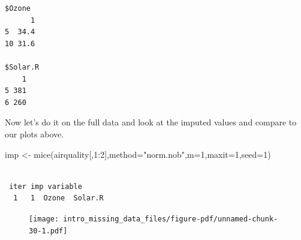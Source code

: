 \documentclass[
  letterpaper,
  DIV=11,
  numbers=noendperiod]{scrreprt}
\newenvironment{Shaded}{\begin{snugshade}}{\end{snugshade}}
\newcommand{\AttributeTok}[1]{\textcolor[rgb]{0.49,0.56,0.16}{#1}}
\newcommand{\DecValTok}[1]{\textcolor[rgb]{0.25,0.63,0.44}{#1}}
\newcommand{\FunctionTok}[1]{\textcolor[rgb]{0.02,0.16,0.49}{#1}}
\newcommand{\NormalTok}[1]{\textcolor[rgb]{0.00,0.44,0.13}{#1}}
\newcommand{\OtherTok}[1]{\textcolor[rgb]{0.00,0.44,0.13}{#1}}
\newcommand{\SpecialCharTok}[1]{\textcolor[rgb]{0.25,0.44,0.63}{#1}}
\newcommand{\StringTok}[1]{\textcolor[rgb]{0.25,0.44,0.63}{#1}}
\begin{document}
\begin{verbatim}
$Ozone
      1
5  34.4
10 31.6

$Solar.R
    1
5 381
6 260
\end{verbatim}

Now let's do it on the full data and look at the imputed values and
compare to our plots above.

\begin{Shaded}
\begin{Highlighting}[]
\NormalTok{  imp }\OtherTok{\textless{}{-}} \FunctionTok{mice}\NormalTok{(airquality[,}\DecValTok{1}\SpecialCharTok{:}\DecValTok{2}\NormalTok{],}\AttributeTok{method=}\StringTok{"norm.nob"}\NormalTok{,}\AttributeTok{m=}\DecValTok{1}\NormalTok{,}\AttributeTok{maxit=}\DecValTok{1}\NormalTok{,}\AttributeTok{seed=}\DecValTok{1}\NormalTok{)}
\end{Highlighting}
\end{Shaded}

\begin{verbatim}

 iter imp variable
  1   1  Ozone  Solar.R
\end{verbatim}

\begin{Shaded}
\end{Shaded}

\begin{figure}[H]

{\centering \texttt{[image: intro\_missing\_data\_files/figure-pdf/unnamed-chunk-30-1.pdf]}

}

\end{figure}
\end{document}
